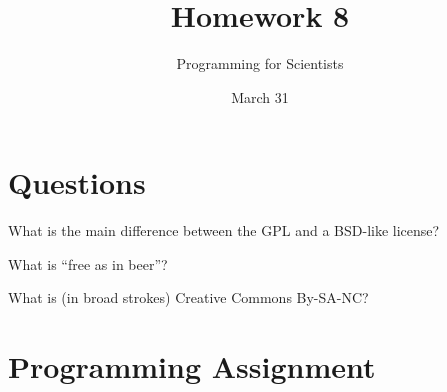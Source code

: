 
\author{Programming for Scientists}
\title{Homework 8}
\date{March 31}

\maketitle

\chapter{Questions}

\question
What is the main difference between the GPL and a BSD-like license?

\question
What is ``free as in beer''?

\question
What is (in broad strokes) Creative Commons By-SA-NC?

\chapter{Programming Assignment}




